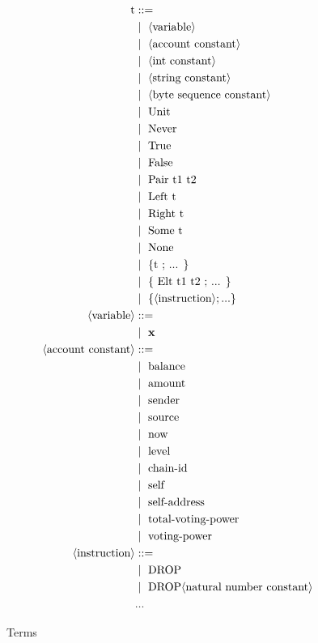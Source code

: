 \documentclass[a4paper,USenglish,cleveref, autoref, thm-restate]{lipics-v2021}
\begin{document}
\begin{figure}[]
\begin{align*}
\text{t} &::= \\
   &\mid\ \langle \text{variable} \rangle \\
   &\mid\ \langle \text{account constant} \rangle \\
   &\mid\ \langle \text{int constant} \rangle \\
   &\mid\ \langle \text{string constant} \rangle \\
   &\mid\ \langle \text{byte sequence constant} \rangle \\
   &\mid\ \text{Unit} \\
   &\mid\ \text{Never} \\
   &\mid\ \text{True} \\
   &\mid\ \text{False} \\
   &\mid\ \text{Pair}\ \text{t1 t2} \\
   &\mid\ \text{Left}\ \text{t}\\
   &\mid\ \text{Right}\ \text{t}\\
   &\mid\ \text{Some}\ \text{t}\\
   &\mid\ \text{None} \\
   &\mid\ \text{\{t ; ... \}}\\
   &\mid\ \text{\{ Elt t1 t2 ; ... \}}\\
   &\mid\ \{ \langle\text{instruction}\rangle; ... \}   \\
\langle \text{variable} \rangle &::= \\ 
   &\mid\ \textbf{x}\\
\langle \text{account constant} \rangle &::= \\ 
   &\mid\ \text{balance} \\
   &\mid\ \text{amount} \\
   &\mid\ \text{sender} \\
   &\mid\ \text{source} \\
   &\mid\ \text{now} \\
   &\mid\ \text{level} \\
   &\mid\ \text{chain-id} \\
   &\mid\ \text{self}  \\
   &\mid\ \text{self-address}  \\
   &\mid\ \text{total-voting-power}  \\
   &\mid\ \text{voting-power}  \\
\langle\text{instruction}\rangle &::= \\
  &\mid\ \text{DROP} \\
  &\mid\ \text{DROP} \langle\text{natural number constant}\rangle \\
  &\text{...}
\end{align*}
\caption{Terms}
\label{fig:term}
\end{figure}
\end{document}

